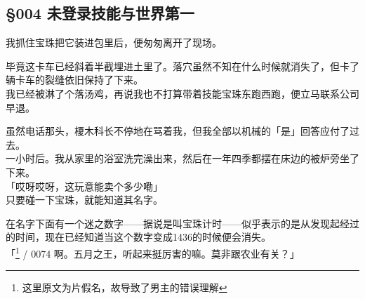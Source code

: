 \subsection{§004 未登录技能与世界第一}

我抓住宝珠把它装进包里后，便匆匆离开了现场。

毕竟这卡车已经斜着半截埋进土里了。落穴虽然不知在什么时候就消失了，但卡了辆卡车的裂缝依旧保持了下来。\\

我已经被淋了个落汤鸡，再说我也不打算带着技能宝珠东跑西跑，便立马联系公司早退。

虽然电话那头，榎木科长不停地在骂着我，但我全部以机械的「是」回答应付了过去。\\

一小时后。我从家里的浴室洗完澡出来，然后在一年四季都摆在床边的被炉旁坐了下来。\\

「哎呀哎呀，这玩意能卖个多少嘞」\\

只要碰一下宝珠，就能知道其名字。

在名字下面有一个迷之数字——据说是叫宝珠计时——似乎表示的是从发现起经过的时间，现在已经知道当这个数字变成1436的时候便会消失。\\

「\footnote{这里原文为片假名，故导致了男主的错误理解} / 0074 啊。五月之王，听起来挺厉害的嘛。莫非跟农业有关？」\\

